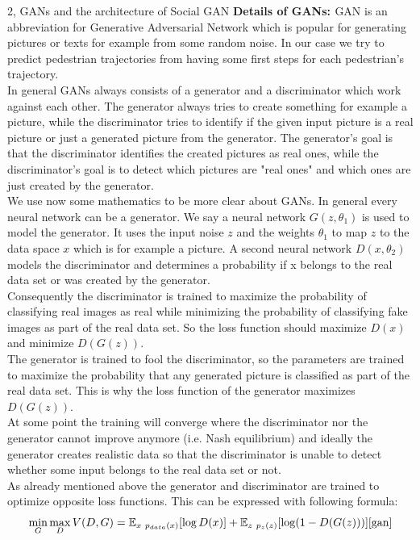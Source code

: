 \documentclass[10pt,a4paper]{article}
\begin{document}
\begin{task}{2, GANs and the architecture of Social GAN}
    \textbf{Details of GANs: \cite{gan}} \bigbreak
    GAN is an abbreviation for Generative Adversarial Network which is popular for generating pictures or texts for example from some random noise. In our case we try to predict pedestrian trajectories from having some first steps for each pedestrian's trajectory.\\
    In general GANs always consists of a generator and a discriminator which work against each other. The generator always tries to create something for example a picture, while the discriminator tries to identify if the given input picture is a real picture or just a generated picture from the generator. The generator's goal is that the discriminator identifies the created pictures as real ones, while the discriminator's goal is to detect which pictures are "real ones" and which ones are just created by the generator.
    \\ We use now some mathematics to be more clear about GANs. In general every neural network can be a generator. We say a neural network $G(z,\theta_1)$ is used to model the generator. It uses the input noise $z$ and the weights $\theta_1$ to map $z$ to the data space $x$ which is for example a picture. A second neural network $D(x,\theta_2)$ models the discriminator and determines a probability if x belongs to the real data set or was created by the generator.\\
    Consequently the discriminator is trained to maximize the probability of classifying real images as real while minimizing the probability of classifying fake images as part of the real data set. So the loss function should maximize $D(x)$ and minimize $D(G(z))$.\\
    The generator is trained to fool the discriminator, so the parameters are trained to maximize the probability that any generated picture is classified as part of the real data set. This is why the loss function of the generator maximizes $D(G(z))$.\\
    At some point the training will converge where the discriminator nor the generator cannot improve anymore (i.e. Nash equilibrium) and ideally the generator creates realistic data so that the discriminator is unable to detect whether some input belongs to the real data set or not. \cite{gan} \\
    As already mentioned above the generator and discriminator are trained to optimize opposite loss functions. This can be expressed with following formula: 
    \begin{equation*}
        \min_{G}\max_{D}V(D,G) = \mathbb{E}_{x~p_{data}(x)}[\log D(x)]+\mathbb{E}_{z~p_{z}(z)}[\log (1-D(G(z)))] \cite{gan}
    \end{equation*}
    

\end{task}
\end{document}
